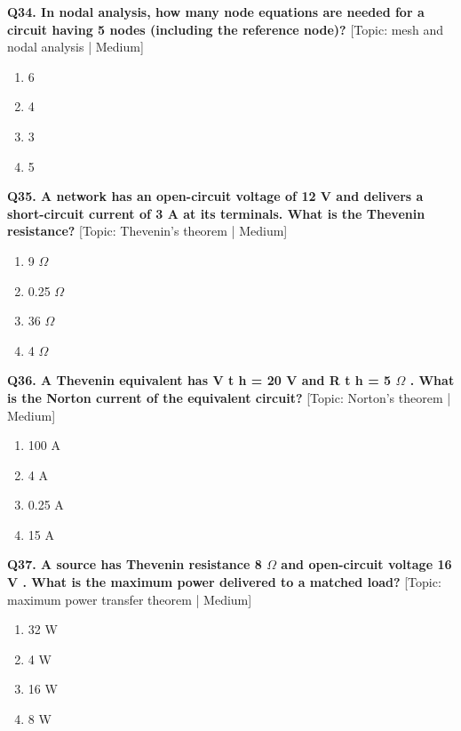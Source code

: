 \noindent\textbf{Q34. In nodal analysis, how many node equations are needed for a circuit having 5 nodes (including the reference node)?} \hfill [Topic: mesh and nodal analysis | Medium]
\begin{enumerate}[label=(\alph*),topsep=2pt,itemsep=1pt,partopsep=0pt,parsep=0pt]
    \item {6}
    \item {4}
    \item {3}
    \item {5}
\end{enumerate}
\vspace{2mm}

\noindent\textbf{Q35. A network has an open-circuit voltage of 12 V and delivers a short-circuit current of 3 A at its terminals. What is the Thevenin resistance?} \hfill [Topic: Thevenin's theorem | Medium]
\begin{enumerate}[label=(\alph*),topsep=2pt,itemsep=1pt,partopsep=0pt,parsep=0pt]
    \item {9 $\Omega$}
    \item {0.25 $\Omega$}
    \item {36 $\Omega$}
    \item {4 $\Omega$}
\end{enumerate}
\vspace{2mm}

\noindent\textbf{Q36. A Thevenin equivalent has V t h = 20 V and R t h = 5 $\Omega$ . What is the Norton current of the equivalent circuit?} \hfill [Topic: Norton's theorem | Medium]
\begin{enumerate}[label=(\alph*),topsep=2pt,itemsep=1pt,partopsep=0pt,parsep=0pt]
    \item {100 A}
    \item {4 A}
    \item {0.25 A}
    \item {15 A}
\end{enumerate}
\vspace{2mm}

\noindent\textbf{Q37. A source has Thevenin resistance 8 $\Omega$ and open-circuit voltage 16 V . What is the maximum power delivered to a matched load?} \hfill [Topic: maximum power transfer theorem | Medium]
\begin{enumerate}[label=(\alph*),topsep=2pt,itemsep=1pt,partopsep=0pt,parsep=0pt]
    \item {32 W}
    \item {4 W}
    \item {16 W}
    \item {8 W}
\end{enumerate}
\vspace{2mm}


